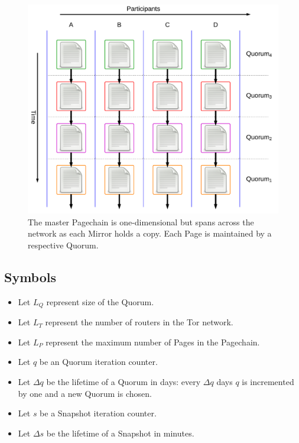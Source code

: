 \documentclass{sig-alternate}
\begin{document}
\begin{figure}[htbp]
	\centering
	\includegraphics[width=1\linewidth]{../images/LucidCharts/Data-Structure-Overview.pdf}
	\caption{The master Pagechain is one-dimensional but spans across the network as each Mirror holds a copy. Each Page is maintained by a respective Quorum.}
\end{figure}

\subsection{Symbols} %

\begin{itemize}[noitemsep,nolistsep]
	\item Let $ L_{Q} $ represent size of the Quorum.
	\item Let $ L_{T} $ represent the number of routers in the Tor network.
	\item Let $ L_{P} $ represent the maximum number of Pages in the Pagechain.
	\item Let $ q $ be an Quorum iteration counter.
	\item Let $ \Delta q $ be the lifetime of a Quorum in days: every $ \Delta q $ days $ q $ is incremented by one and a new Quorum is chosen.
	\item Let $ s $ be a Snapshot iteration counter.
	\item Let $ \Delta s $ be the lifetime of a Snapshot in minutes.
\end{itemize}
\end{document}
